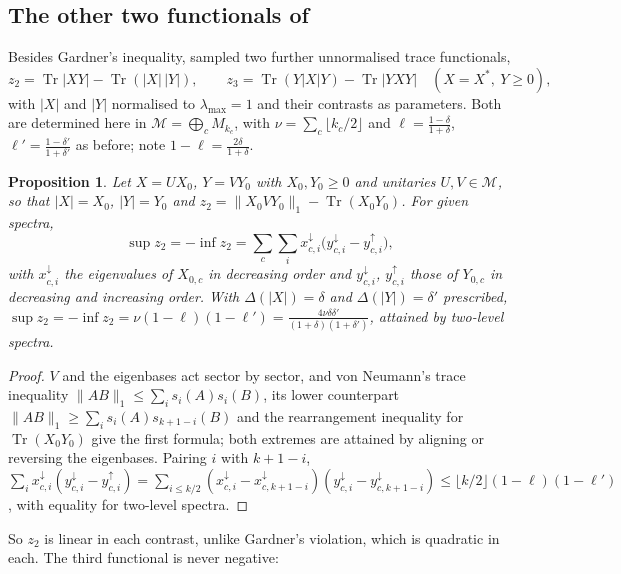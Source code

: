 \documentclass[11pt]{article}
\DeclareMathOperator{\Tr}{Tr}
\newcommand{\M}{\mathcal{M}}
\theoremstyle{plain}
\newtheorem{proposition}[theorem]{Proposition}
\theoremstyle{definition}
\theoremstyle{remark}
\begin{document}
\subsection{The other two functionals of~\cite{abed2024}}\label{sec:exp23}

Besides Gardner's inequality, \cite[Sect.~5]{abed2024} sampled two further unnormalised trace functionals,
\[
  z_2=\Tr|XY|-\Tr(|X|\,|Y|),\qquad z_3=\Tr(Y|X|Y)-\Tr|YXY|\quad(X=X^*,\ Y\ge0),
\]
with $|X|$ and $|Y|$ normalised to $\lambda_{\max}=1$ and their contrasts as parameters. Both are determined here in
$\M=\bigoplus_cM_{k_c}$, with $\nu=\sum_c\lfloor k_c/2\rfloor$ and $\ell=\frac{1-\delta}{1+\delta}$, $\ell'=\frac{1-\delta'}{1+\delta'}$
as before; note $1-\ell=\frac{2\delta}{1+\delta}$.

\begin{proposition}\label{prop:exp2}
Let $X=UX_0$, $Y=VY_0$ with $X_0,Y_0\ge0$ and unitaries $U,V\in\M$, so that $|X|=X_0$, $|Y|=Y_0$ and
$z_2=\|X_0VY_0\|_1-\Tr(X_0Y_0)$. For given spectra,
\[
  \sup z_2=-\inf z_2=\sum_c\sum_ix_{c,i}^\downarrow\bigl(y_{c,i}^\downarrow-y_{c,i}^\uparrow\bigr),
\]
with $x_{c,i}^\downarrow$ the eigenvalues of $X_{0,c}$ in decreasing order and $y_{c,i}^\downarrow$, $y_{c,i}^\uparrow$ those of
$Y_{0,c}$ in decreasing and increasing order. With $\Delta(|X|)=\delta$ and $\Delta(|Y|)=\delta'$ prescribed,
$\sup z_2=-\inf z_2=\nu(1-\ell)(1-\ell')=\frac{4\nu\delta\delta'}{(1+\delta)(1+\delta')}$, attained by two-level spectra.
\end{proposition}
\begin{proof}
$V$ and the eigenbases act sector by sector, and von Neumann's trace inequality $\|AB\|_1\le\sum_is_i(A)s_i(B)$, its lower
counterpart $\|AB\|_1\ge\sum_is_i(A)s_{k+1-i}(B)$ and the rearrangement inequality for $\Tr(X_0Y_0)$ give the first
formula; both extremes are attained by aligning or reversing the eigenbases. Pairing $i$ with $k+1-i$,
$\sum_ix_{c,i}^\downarrow(y_{c,i}^\downarrow-y_{c,i}^\uparrow)=\sum_{i\le k/2}(x_{c,i}^\downarrow-x_{c,k+1-i}^\downarrow)
(y_{c,i}^\downarrow-y_{c,k+1-i}^\downarrow)\le\lfloor k/2\rfloor(1-\ell)(1-\ell')$, with equality for two-level spectra.
\end{proof}

\noindent So $z_2$ is linear in each contrast, unlike Gardner's violation, which is quadratic in each. The third
functional is never negative:
\end{document}
